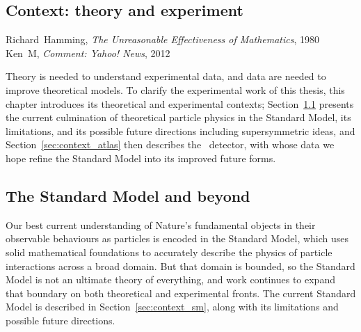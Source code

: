 \begin{singlespacing}
\chapter{Context: theory and experiment}
\label{chapter:context}
%
\begin{epigraphs}
%
{Richard~Hamming,
\textit{The Unreasonable Effectiveness of Mathematics},
1980~\cite{hamming1980unreasonable}}
%
{Ken~M,
\textit{Comment: Yahoo! News},
2012~\cite{kenm2012inner}}
\end{epigraphs}
\end{singlespacing}

\noindent Theory is needed to understand experimental data,
and data are needed to improve theoretical models.
To clarify the experimental work of this thesis, this chapter introduces its
theoretical and experimental contexts;
Section~\ref{sec:context_sm_and_beyond} presents the current culmination of
theoretical particle physics in the Standard Model, its limitations, and its
possible future directions including supersymmetric ideas, and
Section~\ref{sec:context_atlas} then describes the \atlas\ detector, with whose
data we hope refine the Standard Model into its improved future forms.


\section{The Standard Model and beyond}
\label{sec:context_sm_and_beyond}
\noindent Our best current understanding of Nature's fundamental objects in
their observable behaviours as particles is encoded in the Standard Model,
which uses solid mathematical foundations to accurately describe the physics
of particle interactions across a broad domain.
But that domain is bounded, so the Standard Model is not an ultimate theory of
everything, and work continues to expand that boundary on both theoretical and
experimental fronts.
The current Standard Model is described in Section~\ref{sec:context_sm},
along with its limitations and possible future directions.

